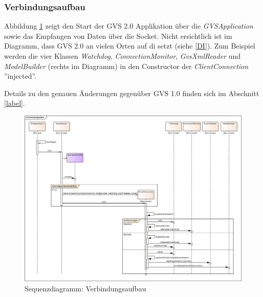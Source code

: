 \documentclass[11pt,a4paper,english,oneside]{book}
\numberwithin{equation}{chapter}
\begin{document}
	\subsubsection{Verbindungsaufbau}
	Abbildung \ref{fig:sd-verbindungsaufbau-2} zeigt den Start der GVS 2.0 Applikation über die \textit{GVSApplication} sowie das Empfangen von Daten über die Socket. Nicht ersichtlich ist im Diagramm, dass GVS 2.0 an vielen Orten auf \gls{di} setzt (siehe \ref{DI}). Zum Beispiel werden die vier Klassen \textit{Watchdog},  \textit{ConnectionMonitor},  \textit{GvsXmlReader} und  \textit{ModelBuilder} (rechts im Diagramm) in den Constructor der  \textit{ClientConnection} ''injected''.
	
	Details zu den genauen Änderungen gegenüber GVS 1.0 finden sich im Abschnitt \ref{label}. %

	\begin{figure}[h!]
		\centering
		\includegraphics[width=\linewidth]{assets/images/sequence_Verbindungsaufbau}
		\caption{Sequenzdiagramm: Verbindungsaufbau}
		\label{fig:sd-verbindungsaufbau-2}
	\end{figure}
	
\end{document}

